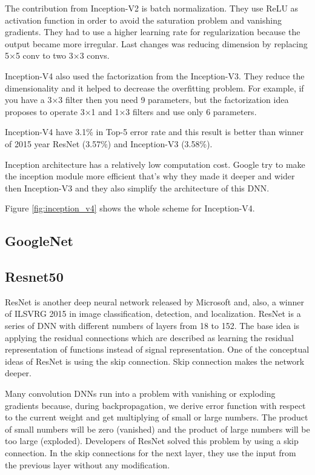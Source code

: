 \documentclass[titlepage]{report}
\begin{document}
The contribution from Inception-V2 is batch normalization. They use ReLU as activation function in order to avoid the saturation problem and vanishing gradients. They had to use a higher learning rate for regularization because the output became more irregular. Last changes was reducing dimension by replacing   5×5 conv to two 3×3 convs. 

Inception-V4 also used the factorization from the Inception-V3. They reduce the dimensionality and it helped to decrease the overfitting problem. For example, if you have a 3×3 filter then you need 9 parameters, but the factorization idea proposes to operate  3×1 and  1×3 filters and use only 6 parameters. 

Inception-V4 have 3.1\% in Top-5 error rate and this result is better than winner of 2015 year ResNet (3.57\%) and  Inception-V3 (3.58\%). 

Inception architecture has a relatively low computation cost. Google try to make the inception module more efficient that's why they made it deeper and wider then Inception-V3 and they also simplify the architecture of this DNN.

Figure \ref{fig:inception_v4} shows the whole scheme for Inception-V4.

\subsection{GoogleNet}
\lipsum[3]

\subsection{Resnet50}
ResNet is another deep neural network released by Microsoft and, also, a winner of ILSVRG 2015 in image classification, detection, and localization. ResNet is a series of DNN with different numbers of layers from 18 to 152. The base idea is applying the residual connections which are described as learning the residual representation of functions instead of signal representation. One of the conceptual ideas of ResNet is using the skip connection. Skip connection makes the network deeper.  

Many convolution DNNs run into a problem with vanishing or exploding gradients because, during backpropagation, we derive error function with respect to the current weight and get multiplying of small or large numbers. The product of small numbers will be zero (vanished) and the product of large numbers will be too large (exploded). Developers of ResNet solved this problem by using a skip connection. In the skip connections for the next layer, they use the input from the previous layer without any modification. 
\end{document}
